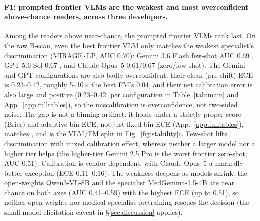 \paragraph{F1: prompted frontier VLMs are the weakest and most overconfident above-chance readers, across three developers.}
Among the readers above near-chance, the prompted frontier VLMs rank last. On the raw B-scan, even the best frontier
VLM only matches the weakest specialist's discrimination (MIRAGE\,$\cdot$\,LP, AUC \num{0.70}): Gemini 3.6 Flash few-shot AUC
\num{0.69} , GPT-5.6 Sol \num{0.67} , and Claude Opus~5 \num{0.61}/\num{0.67}
(zero/few-shot). The Gemini and GPT configurations are also badly overconfident: their clean (pre-shift) ECE is
\num{0.23}--\num{0.42}, roughly 5--10$\times$ the best FM's \num{0.04}, and their net calibration
error is also large and positive (\num{0.23}--\num{0.42}; per configuration in Table~\ref{tab:main} and
App.~\ref{app:fulltables}), so the miscalibration is overconfidence, not two-sided noise. The gap is not a binning
artifact: it holds under a strictly proper score (Brier) and adaptive-bin ECE, not just fixed-bin ECE
(App.~\ref{app:fulltables}), matches \citet{groot2024overconfidence, xia2024cares}, and is the VLM/FM split in
Fig.~\ref{fig:stability}c. Few-shot lifts discrimination with mixed calibration effect, whereas neither a larger model
nor a higher tier helps (the higher-tier Gemini 2.5 Pro is the worst frontier zero-shot, AUC \num{0.51}). Calibration
is vendor-dependent, with Claude Opus~5 a markedly better exception (ECE \num{0.11}--\num{0.16}). The weakness deepens as models shrink: the open-weights
Qwen3-VL-8B and the specialist MedGemma-1.5-4B are near chance on both axes (AUC \num{0.41}--\num{0.59}) with the highest
ECE (up to \num{0.51}), so neither open weights nor medical-specialist pretraining rescues the decision (the
small-model elicitation caveat in \S\ref{sec:discussion} applies).

